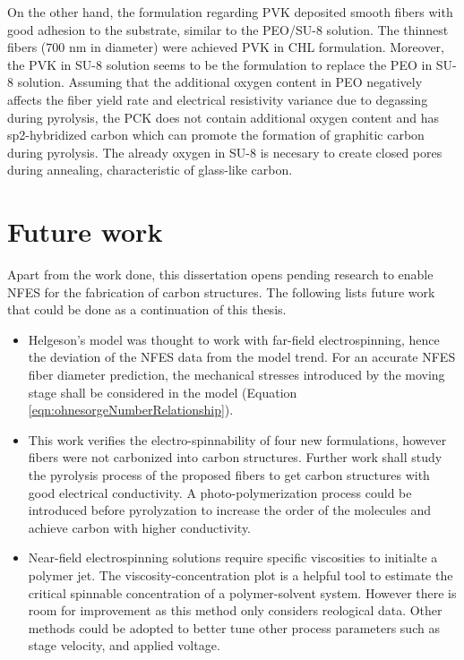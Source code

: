 On the other hand, the formulation regarding PVK deposited smooth fibers with good adhesion to the substrate, similar to the PEO/SU-8 solution. The thinnest fibers ($700 \textrm{ nm}$ in diameter) were achieved PVK in CHL formulation. Moreover, the PVK in SU-8 solution seems to be the formulation to replace the PEO in SU-8 solution. Assuming that the additional oxygen content in PEO negatively affects the fiber yield rate and electrical resistivity variance due to degassing during pyrolysis, the PCK does not contain additional oxygen content and has sp2-hybridized carbon which can promote the formation of graphitic carbon during pyrolysis. The already oxygen in SU-8 is necesary to create closed pores during annealing, characteristic of glass-like carbon.

\section{Future work}

Apart from the work done, this dissertation opens pending research to enable NFES for the fabrication of carbon structures. The following lists future work that could be done as a continuation of this thesis.

\begin{itemize}
\item Helgeson's model \cite{Helgeson2007} was thought to work with far-field electrospinning, hence the deviation of the NFES data from the model trend. For an accurate NFES fiber diameter prediction, the mechanical stresses introduced by the moving stage shall be considered in the model (Equation \ref{eqn:ohnesorgeNumberRelationship}). 
\item This work verifies the electro-spinnability of four new formulations, however fibers were not carbonized into carbon structures. Further work shall study the pyrolysis process of the proposed fibers to get carbon structures with good electrical conductivity. A photo-polymerization process could be introduced before pyrolyzation to increase the order of the molecules and achieve carbon with higher conductivity.
\item Near-field electrospinning solutions require specific viscosities to initialte a polymer jet. The viscosity-concentration plot is a helpful tool to estimate the critical spinnable concentration of a polymer-solvent system. However there is room for improvement as this method only considers reological data. Other methods could be adopted to better tune other process parameters such as stage velocity, and applied voltage.
\end{itemize}



